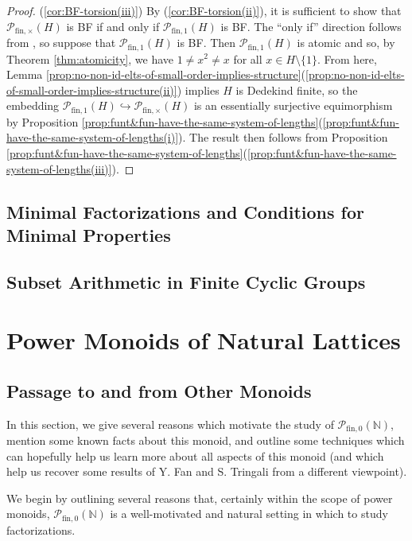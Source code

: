 \documentclass{report}
\newcommand{\NN}{\mathbb{N}}
\renewcommand{\P}{\mathcal{P}}
\newcommand{\fin}{\textrm{fin}}
\newcommand{\funt}{{\textrm{fin}, \times}}
\newcommand{\fun}{{\textrm{fin}, 1}}
\renewcommand{\:}{\text{:}}
\newcommand{\PN}{{\P_{\fin,0}(\NN)}}
\theoremstyle{definition}
\begin{document}
\begin{proof}
(\ref{cor:BF-torsion(iii)}) 
By (\ref{cor:BF-torsion(ii)}), it is sufficient to show that $\P_\funt(H)$ is BF if and only if $\P_\fun(H)$ is BF.
The ``only if'' direction follows from \cite[Theorem 2.28(iv) and Corollary 2.29]{fan-tringali18}, so suppose that $\P_\fun(H)$ is BF.
Then $\P_\fun(H)$ is atomic and so, by Theorem \ref{thm:atomicity}, we have $1\neq x^2 \neq x$ for all $x\in H\setminus\{1\}$.
From here, Lemma \ref{prop:no-non-id-elts-of-small-order-implies-structure}(\ref{prop:no-non-id-elts-of-small-order-implies-structure(ii)}) implies $H$ is Dedekind finite, so the embedding $\P_\fun(H)\hookrightarrow\P_\funt(H)$ is an essentially surjective equimorphism by Proposition \ref{prop:funt&fun-have-the-same-system-of-lengths}(\ref{prop:funt&fun-have-the-same-system-of-lengths(i)}).
The result then follows from Proposition \ref{prop:funt&fun-have-the-same-system-of-lengths}(\ref{prop:funt&fun-have-the-same-system-of-lengths(iii)}).
\end{proof}




\section{Minimal Factorizations and Conditions for Minimal Properties} \label{sec:min fac}


\section{Subset Arithmetic in Finite Cyclic Groups} \label{sec:finite cyclic}

\chapter{Power Monoids of Natural Lattices} \label{ch:applications}
\section{Passage to and from Other Monoids} \label{sec:passage}

In this section, we give several reasons which motivate the study of $\PN$, mention some known facts about this monoid, and outline some techniques which can hopefully help us learn more about all aspects of this monoid (and which help us recover some results of Y. Fan and S. Tringali from a different viewpoint).

We begin by outlining several reasons that, certainly within the scope of power monoids, $\PN$ is a well-motivated and natural setting in which to study factorizations.
\end{document}
